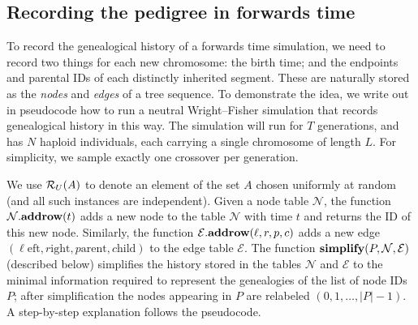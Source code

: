 \documentclass{article}
\newcommand{\Nt}{\mathcal{N}}  %
\newcommand{\Et}{\mathcal{E}}  %
\newcommand{\taddrow}[2]{#1.\mbox{\textbf{addrow}}(#2)}
\newcommand{\tsimplify}[1]{\mbox{\textbf{simplify}}(#1)}
\begin{document}
\subsection*{Recording the pedigree in forwards time}

To record the genealogical history of a forwards time simulation,
we need to record two things for each new chromosome:
the birth time; and the endpoints and parental IDs of each distinctly inherited segment.
These are naturally stored as the \emph{nodes} and \emph{edges} of a tree sequence.
To demonstrate the idea, we write out in pseudocode how to run a neutral Wright--Fisher simulation
that records genealogical history in this way.
The simulation will run for $T$ generations,
and has $N$ haploid individuals, each carrying a single chromosome of length $L$.
For simplicity, we sample exactly one crossover per generation.

We use $\mathcal{R}_U(A)$ to denote an element of the set $A$ chosen uniformly at random
(and all such instances are independent).
Given a node table $\Nt$, the function $\taddrow{\Nt}{t}$
adds a new node to the table $\Nt$ with time $t$
and returns the ID of this new node.
Similarly, the function $\taddrow{\Et}{\ell, r, p, c}$
adds a new edge $(\ell\text{eft}, r\text{ight}, p\text{arent}, c\text{hild})$ to the edge table $\Et$.
The function $\tsimplify{P, \Nt, \Et}$ (described below) %
simplifies the history stored in the tables $\Nt$ and $\Et$
to the minimal information required to represent the genealogies of the list of node IDs $P$;
after simplification the nodes appearing in $P$ are relabeled $(0, 1, \ldots, |P|-1)$.
A step-by-step explanation follows the pseudocode.
\end{document}
